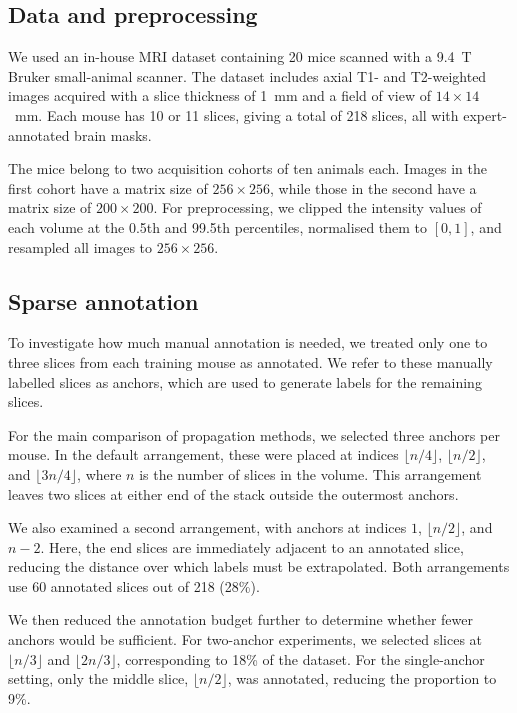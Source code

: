 \documentclass{article}
\begin{document}
\subsection{Data and preprocessing}

We used an in-house MRI dataset containing 20 mice scanned with a 9.4~T Bruker small-animal scanner. The dataset includes axial T1- and T2-weighted images acquired with a slice thickness of 1~mm and a field of view of $14\times14$~mm. Each mouse has 10 or 11 slices, giving a total of 218 slices, all with expert-annotated brain masks.

The mice belong to two acquisition cohorts of ten animals each. Images in the first cohort have a matrix size of $256\times256$, while those in the second have a matrix size of $200\times200$. For preprocessing, we clipped the intensity values of each volume at the 0.5th and 99.5th percentiles, normalised them to $[0,1]$, and resampled all images to $256\times256$.

\subsection{Sparse annotation}

To investigate how much manual annotation is needed, we treated only one to three slices from each training mouse as annotated. We refer to these manually labelled slices as anchors, which are used to generate labels for the remaining slices.

For the main comparison of propagation methods, we selected three anchors per mouse. In the default arrangement, these were placed at indices $\lfloor n/4\rfloor$, $\lfloor n/2\rfloor$, and $\lfloor 3n/4\rfloor$, where $n$ is the number of slices in the volume. This arrangement leaves two slices at either end of the stack outside the outermost anchors.

We also examined a second arrangement, with anchors at indices $1$, $\lfloor n/2\rfloor$, and $n-2$. Here, the end slices are immediately adjacent to an annotated slice, reducing the distance over which labels must be extrapolated. Both arrangements use 60 annotated slices out of 218 (28\%).

We then reduced the annotation budget further to determine whether fewer anchors would be sufficient. For two-anchor experiments, we selected slices at $\lfloor n/3\rfloor$ and $\lfloor 2n/3\rfloor$, corresponding to 18\% of the dataset. For the single-anchor setting, only the middle slice, $\lfloor n/2\rfloor$, was annotated, reducing the proportion to 9\%.
\end{document}
